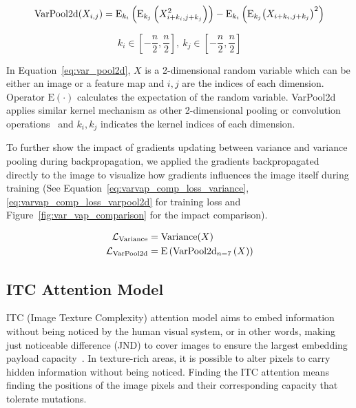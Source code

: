\begin{equation}
  \mathrm{VarPool2d}(X_{i,j}) %
    = \E_{k_i} \left( \E_{k_j} \left( X_{i+k_i,j+k_j}^2 \right) \right) %
    - \E_{k_i} \left( \E_{k_j} {\left( X_{i+k_i,j+k_j} \right)}^2 \right)
  \label{eq:var_pool2d}
\end{equation}

\begin{equation}%
  k_i \in \left[ -\frac{n}{2}, \frac{n}{2} \right],~ k_j \in \left[ -\frac{n}{2}, \frac{n}{2} \right]
  \label{eq:var_pool2d_cond}
\end{equation}

In Equation~\ref{eq:var_pool2d}, \(X\) is a 2-dimensional random variable which can be either an image or a feature map and \(i, j\) are the indices of each dimension. Operator \(\mathrm{E}(\cdot)\) calculates the expectation of the random variable. VarPool2d applies similar kernel mechanism as other 2-dimensional pooling or convolution operations~\cite{MaxPooling,AlexNet} and \(k_i, k_j\) indicates the kernel indices of each dimension.

To further show the impact of gradients updating between variance and variance pooling during backpropagation, we applied the gradients backpropagated directly to the image to visualize how gradients influences the image itself during training (See Equation~\ref{eq:varvap_comp_loss_variance},\ref{eq:varvap_comp_loss_varpool2d} for training loss and Figure~\ref{fig:var_vap_comparison} for the impact comparison).

\begin{align}
    \mathcal{L}_\mathrm{Variance}  &= \mathrm{Variance}(X) \label{eq:varvap_comp_loss_variance} \\
    \mathcal{L}_\mathrm{VarPool2d} &= \mathrm{E} \left( \mathrm{VarPool2d}_{n=7} \left( X \right) \right) \label{eq:varvap_comp_loss_varpool2d}
\end{align}

\figureVarVapComparison%

\subsection{ITC Attention Model}%
\label{ssec:itc_model}

ITC (Image Texture Complexity) attention model aims to embed information without being noticed by the human visual system, or in other words, making just noticeable difference (JND) to cover images to ensure the largest embedding payload capacity~\cite{JND}. In texture-rich areas, it is possible to alter pixels to carry hidden information without being noticed. Finding the ITC attention means finding the positions of the image pixels and their corresponding capacity that tolerate mutations.

